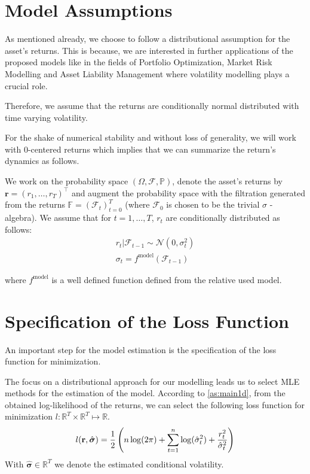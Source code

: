 \documentclass[a4paper, oneside]{discothesis}
\begin{document}
\section{Model Assumptions}

As mentioned already, we choose to follow a distributional assumption for the asset's returns. This is because, we are interested in further applications of the proposed models like in the fields of Portfolio Optimization, Market Risk Modelling and Asset Liability Management where volatility modelling plays a crucial role.

Therefore, we assume that the returns are conditionally normal distributed with time varying volatility.

For the shake of numerical stability and without loss of generality, we will work with 0-centered returns which implies that we can summarize the return's dynamics as follows.

\begin{assumption}\label{as:main1d}
We work on the probability space $\left(\Omega, \mathcal{F}, \mathbb{P}\right)$, denote the asset's returns by $\mathbf{r} = (r_1, \dots, r_T)^\intercal$ and augment the probability space with the filtration generated from the returns $\mathbb{F} = (\mathcal{F}_t)_{t=0}^T$ (where $\mathcal{F}_0$ is chosen to be the trivial $\sigma$ - algebra). We assume that for $t=1, \dots, T$, $r_{t}$ are conditionally distributed as follows:
\begin{equation}
\begin{split}
r_{t}|\mathcal{F}_{t-1}\sim \mathcal{N}(0, \sigma_{t}^2)\\
\sigma_{t} = f^{\text{model}}(\mathcal{F}_{t-1}) 
\end{split}
\end{equation}

where $f^{\text{model}}$ is a well defined function defined from the relative used model.
\end{assumption}
\section{Specification of the Loss Function}

An important step for the model estimation is the specification of the loss function for minimization.

The focus on a distributional approach for our modelling leads us to select MLE methods for the estimation of the model. According to \ref{as:main1d}, from the obtained log-likelihood of the returns, we can select the following loss function for minimization $l:\mathbb{R}^T\times\mathbb{R}^T\mapsto\mathbb{R}$.
\begin{equation}\label{eq:loss1d}
    l(\mathbf{r}, \hat{\boldsymbol{\sigma}}) = \\\frac{1}{2}\left(n\log(2\pi)+\sum_{t=1}^n \log(\hat{\sigma}_t^2)+\frac{r_t^2}{\hat{\sigma}_t^2}\right)
\end{equation}
With $\hat{\mathbf{\sigma}}\in \mathbb{R}^T$ we denote the estimated conditional volatility.
\end{document}
